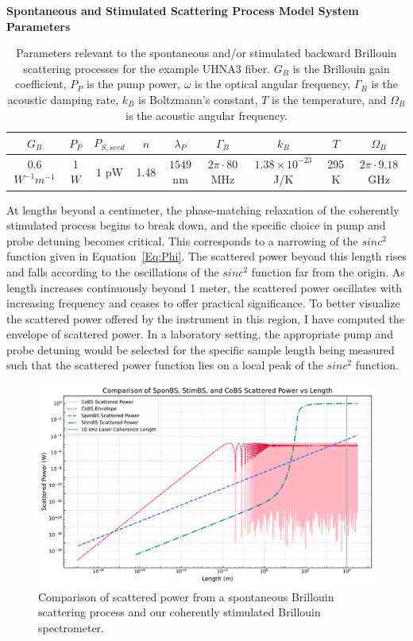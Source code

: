 \begin{table}[ht]
  \centering
  \textbf{Spontaneous and Stimulated Scattering Process Model System Parameters}
  \renewcommand{\arraystretch}{1.2}
  \begin{tabular}{|c|c|c|c|c|c|c|c|c|}
    \hline
    $G_{B}$ & $P_{P}$ & $P_{S,seed}$ & $n$ & $\lambda_P$ & $\Gamma_{B}$ & $k_{B}$ & $T$ & $\Omega_{B}$ \\
    \hline
    0.6 $W^{-1} m^{-1}$ & 1 $W$ & $1$ pW & 1.48 & $1549$ nm & $2\pi \cdot 80$ MHz & $1.38 \times 10^{-23}$ J/K & 295 K & $2\pi \cdot 9.18$ GHz \\
    \hline
  \end{tabular}
  \caption{Parameters relevant to the spontaneous and/or stimulated backward Brillouin scattering processes for the example UHNA3 fiber. $G_{B}$ is the Brillouin gain coefficient, $P_{P}$ is the pump power, $\omega$ is the optical angular frequency, $\Gamma_{B}$ is the acoustic damping rate, $k_{B}$ is Boltzmann's constant, $T$ is the temperature, and $\Omega_{B}$ is the acoustic angular frequency.}
  \label{tab:SBS Parameters}
\end{table}

At lengths beyond a centimeter, the phase-matching relaxation of the coherently stimulated process begins to break down, and the specific choice in pump and probe detuning becomes critical. This corresponds to a narrowing of the $sinc^{2}$ function given in Equation~\ref{Eq:Phi}. The scattered power beyond this length rises and falls according to the oscillations of the $sinc^{2}$ function far from the origin. As length increases continuously beyond 1 meter, the scattered power oscillates with increasing frequency and ceases to offer practical significance. To better visualize the scattered power offered by the instrument in this region, I have computed the envelope of scattered power. In a laboratory setting, the appropriate pump and probe detuning would be selected for the specific sample length being measured such that the scattered power function lies on a local peak of the $sinc^{2}$ function.

\begin{figure}[ht]
\centering
\includegraphics[width=\textwidth]{figs/4-CABS/SponBSvsStimBSvsCoBS.pdf}
\caption{Comparison of scattered power from a spontaneous Brillouin scattering process and our coherently stimulated Brillouin spectrometer.}
\label{fig:SponBSvsStimBSvsCoBS}
\end{figure}

